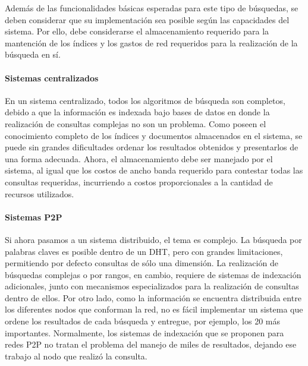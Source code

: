     Además de las funcionalidades básicas esperadas para este tipo de
    búsquedas, se deben considerar que su implementación sea posible según
    las capacidades del sistema. Por ello, debe
    considerarse el almacenamiento requerido para la mantención de los índices
    y los gastos de red requeridos para la realización de la búsqueda
    en sí.
    


    
    \paragraph{Sistemas centralizados}
    En un sistema centralizado, todos los algoritmos de búsqueda son completos,
    debido a que la información es indexada bajo bases de datos en donde la
    realización de consultas complejas no son un problema. Como poseen el
    conocimiento completo de los índices  y documentos almacenados en el sistema,
    se puede sin grandes dificultades
    ordenar los resultados obtenidos y presentarlos de una forma adecuada. Ahora, el
    almacenamiento debe ser manejado por el sistema, al igual que
    los costos de ancho banda requerido para contestar todas las consultas
    requeridas, incurriendo a costos proporcionales a la cantidad de recursos
    utilizados. 
    
    \paragraph{Sistemas P2P}
    Si ahora pasamos a un sistema distribuido, el tema es complejo. La búsqueda por
    palabras claves es posible dentro de un DHT, pero con grandes
    limitaciones, permitiendo por defecto consultas de sólo una dimensión. La
    realización de búsquedas complejas o por rangos, en cambio, requiere de sistemas de
    indexación adicionales, junto con mecanismos especializados para la
    realización de consultas dentro de ellos.
    Por otro lado, como la información se encuentra distribuida entre los
    diferentes nodos que conforman la red, no es fácil implementar un sistema
    que ordene los resultados de cada búsqueda y entregue, por ejemplo, los 20
    más importantes. Normalmente, los sistemas de
    indexación que se proponen para redes P2P no tratan el problema del manejo de
    miles de resultados, dejando ese trabajo al nodo que realizó la consulta.

